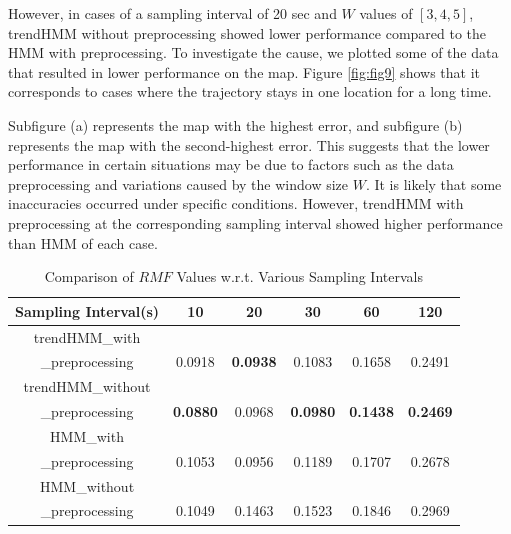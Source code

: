 \documentclass[preprint,12pt]{elsarticle}
\begin{document}
However, in cases of a sampling interval of 20 sec and $W$ values of $[3, 4, 5]$, trendHMM without preprocessing showed lower performance compared to the HMM with preprocessing. To investigate the cause, we plotted some of the data that resulted in lower performance on the map. Figure \ref{fig:fig9} shows that it corresponds to cases where the trajectory stays in one location for a long time. 

	Subfigure (a) represents the map with the highest error, and subfigure (b) represents the map with the second-highest error. This suggests that the lower performance in certain situations may be due to factors such as the data preprocessing %
 and variations caused by the window size $W$. It is likely that some inaccuracies occurred under specific conditions. However, trendHMM with preprocessing at the corresponding sampling interval showed higher performance than HMM of each case.
\begin{table}
	\centering
	\begin{tabular}{|c|c c c c c|}
		\hline
		\textbf{Sampling Interval(s)} & \textbf{10} & \textbf{20} & \textbf{30} & \textbf{60} & \textbf{120} \\ 
		\hline\hline
		trendHMM\_with\\ \_preprocessing & {0.0918} & \textbf{0.0938} & {0.1083} & {0.1658} & {0.2491} \\ 
		\hline
		trendHMM\_without\\ \_preprocessing & \textbf{0.0880} & {0.0968} & \textbf{0.0980} & \textbf{0.1438}  & \textbf{0.2469} \\ 
		\hline
		HMM\_with\\ \_preprocessing & {0.1053} & {0.0956} & {0.1189} & {0.1707}  & {0.2678} \\ 
		\hline
		HMM\_without\\ \_preprocessing & {0.1049} & {0.1463} & {0.1523} & {0.1846}  & {0.2969} \\ 
		\hline
	\end{tabular}
	\caption{Comparison of $RMF$ Values w.r.t. Various Sampling Intervals}
	\label{table:tab1}
\end{table}
\end{document}
